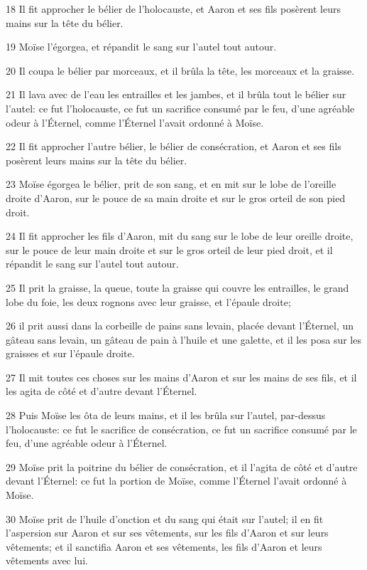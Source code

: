 \par 18 Il fit approcher le bélier de l'holocauste, et Aaron et ses fils posèrent leurs mains sur la tête du bélier.
\par 19 Moïse l'égorgea, et répandit le sang sur l'autel tout autour.
\par 20 Il coupa le bélier par morceaux, et il brûla la tête, les morceaux et la graisse.
\par 21 Il lava avec de l'eau les entrailles et les jambes, et il brûla tout le bélier sur l'autel: ce fut l'holocauste, ce fut un sacrifice consumé par le feu, d'une agréable odeur à l'Éternel, comme l'Éternel l'avait ordonné à Moïse.
\par 22 Il fit approcher l'autre bélier, le bélier de consécration, et Aaron et ses fils posèrent leurs mains sur la tête du bélier.
\par 23 Moïse égorgea le bélier, prit de son sang, et en mit sur le lobe de l'oreille droite d'Aaron, sur le pouce de sa main droite et sur le gros orteil de son pied droit.
\par 24 Il fit approcher les fils d'Aaron, mit du sang sur le lobe de leur oreille droite, sur le pouce de leur main droite et sur le gros orteil de leur pied droit, et il répandit le sang sur l'autel tout autour.
\par 25 Il prit la graisse, la queue, toute la graisse qui couvre les entrailles, le grand lobe du foie, les deux rognons avec leur graisse, et l'épaule droite;
\par 26 il prit aussi dans la corbeille de pains sans levain, placée devant l'Éternel, un gâteau sans levain, un gâteau de pain à l'huile et une galette, et il les posa sur les graisses et sur l'épaule droite.
\par 27 Il mit toutes ces choses sur les mains d'Aaron et sur les mains de ses fils, et il les agita de côté et d'autre devant l'Éternel.
\par 28 Puis Moïse les ôta de leurs mains, et il les brûla sur l'autel, par-dessus l'holocauste: ce fut le sacrifice de consécration, ce fut un sacrifice consumé par le feu, d'une agréable odeur à l'Éternel.
\par 29 Moïse prit la poitrine du bélier de consécration, et il l'agita de côté et d'autre devant l'Éternel: ce fut la portion de Moïse, comme l'Éternel l'avait ordonné à Moïse.
\par 30 Moïse prit de l'huile d'onction et du sang qui était sur l'autel; il en fit l'aspersion sur Aaron et sur ses vêtements, sur les fils d'Aaron et sur leurs vêtements; et il sanctifia Aaron et ses vêtements, les fils d'Aaron et leurs vêtements avec lui.
